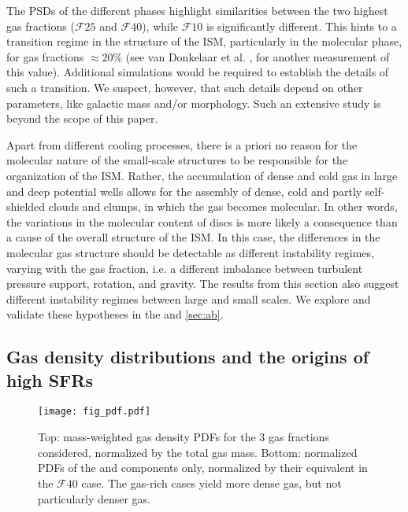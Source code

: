 \documentclass[useAMS,usenatbib]{mnras}
\newcommand{\gs}{\ensuremath{\mathcal{F}10}\xspace}
\newcommand{\gm}{\ensuremath{\mathcal{F}25}\xspace}
\newcommand{\gl}{\ensuremath{\mathcal{F}40}\xspace}
\begin{document}
The PSDs of the different phases highlight similarities between the two highest gas fractions (\gm and \gl), while \gs is significantly different. This hints to a transition regime in the structure of the ISM, particularly in the molecular phase, for gas fractions $\approx 20\%$ (see van Donkelaar et al. \inprep, for another measurement of this value). Additional simulations would be required to establish the details of such a transition. We suspect, however, that such details depend on other parameters, like galactic mass and/or morphology. Such an extensive study is beyond the scope of this paper.

Apart from different cooling processes, there is a priori no reason for the molecular nature of the small-scale structures to be responsible for the organization of the ISM. Rather, the accumulation of dense and cold gas in large and deep potential wells allows for the assembly of dense, cold and partly self-shielded clouds and clumps, in which the gas becomes molecular. In other words, the variations in the molecular content of discs is more likely a consequence than a cause of the overall structure of the ISM. In this case, the differences in the molecular gas structure should be detectable as different instability regimes, varying with the gas fraction, i.e. a different imbalance between turbulent pressure support, rotation, and gravity. The results from this section also suggest different instability regimes between large and small scales. We explore and validate these hypotheses in the  and \ref{sec:ab}.

\subsection{Gas density distributions and the origins of high SFRs}

\begin{figure}
\centering
\texttt{[image: fig\_pdf.pdf]}
\caption{Top: mass-weighted gas density PDFs for the 3 gas fractions considered, normalized by the total gas mass. Bottom: normalized PDFs of the \hi and \htwo components only, normalized by their equivalent in the \gl case. The gas-rich cases yield more dense gas, but not particularly denser gas.}
\label{fig:pdf}
\end{figure}
\end{document}
